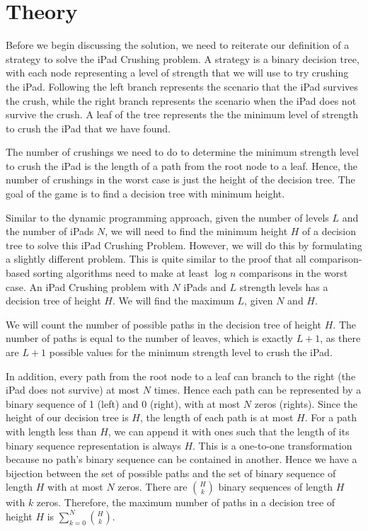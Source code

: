 \documentclass[12pt,a4paper,oneside]{report}
\begin{document}
\section{Theory}
Before we begin discussing the solution, we need to reiterate our definition of a strategy to solve the iPad Crushing problem. A strategy is a binary decision tree, with each node representing a level of strength that we will use to try crushing the iPad. Following the left branch represents the scenario that the iPad survives the crush, while the right branch represents the scenario when the iPad does not survive the crush. A leaf of the tree represents the the minimum level of strength to crush the iPad that we have found.

The number of crushings we need to do to determine the minimum strength level to crush the iPad is the length of a path from the root node to a leaf. Hence, the number of crushings in the worst case is just the height of the decision tree. The goal of the game is to find a decision tree with minimum height.

Similar to the dynamic programming approach, given the number of levels $L$ and the number of iPads $N$, we will need to find the minimum height $H$ of a decision tree to solve this iPad Crushing Problem. However, we will do this by formulating a slightly different problem. This is quite similar to the proof that all comparison-based sorting algorithms need to make at least $\log n$ comparisons in the worst case. An iPad Crushing problem with $N$ iPads and $L$ strength levels has a decision tree of height $H$. We will find the maximum $L$, given $N$ and $H$.

We will count the number of possible paths in the decision tree of height $H$. The number of paths is equal to the number of  leaves, which is exactly $L+1$, as there are $L+1$ possible values for the minimum strength level to crush the iPad.

In addition, every path from the root node to a leaf can branch to the right (the iPad does not survive) at most $N$ times. Hence each path can be represented by a binary sequence of 1 (left) and 0 (right), with at most $N$ zeros (rights). Since the height of our decision tree is $H$, the length of each path is at most $H$. For a path with length less than $H$, we can append it with ones such that the length of its binary sequence representation is always $H$. This is a one-to-one transformation because no path's binary sequence can be contained in another. Hence we have a bijection between the set of possible paths and the set of binary sequence of length $H$ with at most $N$ zeros. There are ${H \choose k}$ binary sequences of length $H$ with $k$ zeros. Therefore, the maximum number of paths in a decision tree of height $H$ is $\sum_{k=0}^{N} {H \choose k}$.
\end{document}

